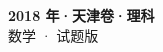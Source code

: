 \documentclass[zihao=-4, a4paper]{ctexart}
\begin{document}
\begin{center}
  {\Large\bfseries 2018 年·天津卷·理科}\\[4pt]
  {\large 数学 · 试题版}
\end{center}
\medskip
{}

\end{document}
